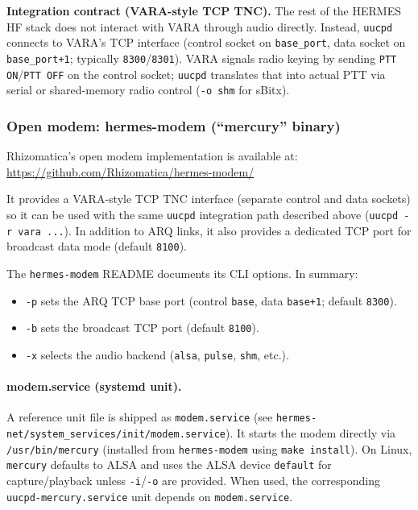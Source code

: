 \textbf{Integration contract (VARA-style TCP TNC).} The rest of the HERMES HF stack does not interact with VARA through audio directly.
Instead, \verb|uucpd| connects to VARA's TCP interface (control socket on \verb|base_port|, data socket on \verb|base_port+1|; typically
\verb|8300|/\verb|8301|). VARA signals radio keying by sending \verb|PTT ON|/\verb|PTT OFF| on the control socket; \verb|uucpd| translates
that into actual PTT via serial or shared-memory radio control (\verb|-o shm| for sBitx).

\subsubsection{Open modem: hermes-modem (``mercury'' binary)}

Rhizomatica's open modem implementation is available at:
\url{https://github.com/Rhizomatica/hermes-modem/}

It provides a VARA-style TCP TNC interface (separate control and data sockets) so it can be used with the same \verb|uucpd| integration
path described above (\verb|uucpd -r vara ...|). In addition to ARQ links, it also provides a dedicated TCP port for broadcast data mode
(default \verb|8100|).

The \verb|hermes-modem| README documents its CLI options. In summary:
\begin{itemize}
\item \verb|-p| sets the ARQ TCP base port (control \verb|base|, data \verb|base+1|; default \verb|8300|).
\item \verb|-b| sets the broadcast TCP port (default \verb|8100|).
\item \verb|-x| selects the audio backend (\verb|alsa|, \verb|pulse|, \verb|shm|, etc.).
\end{itemize}

\paragraph{modem.service (systemd unit).} A reference unit file is shipped as \verb|modem.service| (see
\verb|hermes-net/system_services/init/modem.service|). It starts the modem directly via \verb|/usr/bin/mercury| (installed from
\verb|hermes-modem| using \verb|make install|). On Linux, \verb|mercury| defaults to ALSA and uses the ALSA device \verb|default| for
capture/playback unless \verb|-i|/\verb|-o| are provided. When used, the corresponding \verb|uucpd-mercury.service| unit depends on
\verb|modem.service|.

